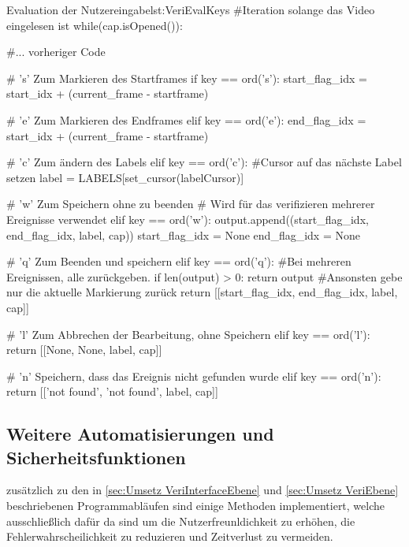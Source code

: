 \begin{pythoncode}{Evaluation der Nutzereingabe}{lst:VeriEvalKeys}
#Iteration solange das Video eingelesen ist
while(cap.isOpened()):

     #... vorheriger Code
     
    # 's' Zum Markieren des Startframes
    if key == ord('s'):
        start_flag_idx = start_idx + (current_frame - startframe)
    
    # 'e' Zum Markieren des Endframes
    elif key == ord('e'):
        end_flag_idx = start_idx + (current_frame - startframe)
    
    # 'c' Zum ändern des Labels
    elif key == ord('c'):
        #Cursor auf das nächste Label setzen
        label = LABELS[set_cursor(labelCursor)]

    # 'w' Zum Speichern ohne zu beenden
    # Wird für das verifizieren mehrerer Ereignisse verwendet
    elif key == ord('w'):
        output.append((start_flag_idx, end_flag_idx, label, cap))
        start_flag_idx = None
        end_flag_idx = None
    
    # 'q' Zum Beenden und speichern
    elif key == ord('q'):
        #Bei mehreren Ereignissen, alle zurückgeben.
        if len(output) > 0:
            return output
        #Ansonsten gebe nur die aktuelle Markierung zurück
        return [[start_flag_idx, end_flag_idx, label, cap]]
    
    # 'l' Zum Abbrechen der Bearbeitung, ohne Speichern
    elif key == ord('l'):
        return [[None, None, label, cap]]
    
    # 'n' Speichern, dass das Ereignis nicht gefunden wurde
    elif key == ord('n'):
        return [['not found', 'not found', label, cap]]

\end{pythoncode}



\subsection{Weitere Automatisierungen und Sicherheitsfunktionen} \label{sec:Umsetz VeriZusatz}
zusätzlich zu den in \autoref{sec:Umsetz VeriInterfaceEbene} und \autoref{sec:Umsetz VeriEbene} beschriebenen Programmabläufen sind einige Methoden implementiert, welche ausschließlich dafür da sind um die Nutzerfreunldichkeit zu erhöhen, die Fehlerwahrscheilichkeit zu reduzieren und Zeitverlust zu vermeiden. \par


